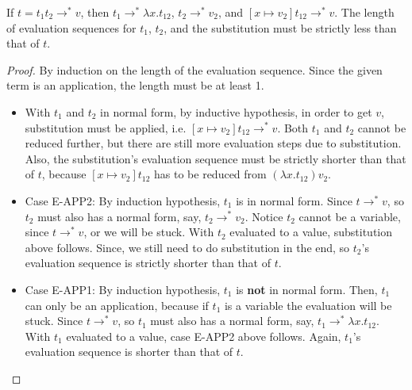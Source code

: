 \documentclass[12pt]{article}
\begin{document}
\begin{lemma}
\label{lemma:recover}
If $t = t_1t_2 \rightarrow^* v$, then $t_1 \rightarrow^* \lambda x . t_{12}$, $t_2 \rightarrow^* v_2$, and $[x \mapsto v_2] t_{12} \rightarrow^* v$.
The length of evaluation sequences for $t_1$, $t_2$, and the substitution must be strictly less than that of $t$.
\end{lemma}
\begin{proof}
By induction on the length of the evaluation sequence.
Since the given term is an application, the length must be at least 1.
\begin{itemize}
\item
With $t_1$ and $t_2$ in normal form, by inductive hypothesis, in order to get $v$, substitution must be applied, i.e. $[x \mapsto v_2] t_{12} \rightarrow^* v$.
Both $t_1$ and $t_2$ cannot be reduced further, but there are still more evaluation steps due to substitution.
Also, the substitution's evaluation sequence must be strictly shorter than that of $t$, because $[x \mapsto v_2] t_{12}$ has to be reduced from $(\lambda x . t_{12}) v_2$.
\item
Case E-APP2:
By induction hypothesis, $t_1$ is in normal form.
Since $t \rightarrow^* v$, so $t_2$ must also has a normal form, say, $t_2 \rightarrow^* v_2$.
Notice $t_2$ cannot be a variable, since $t \rightarrow^* v$, or we will be stuck.
With $t_2$ evaluated to a value, substitution above follows.
Since, we still need to do substitution in the end, so $t_2$'s evaluation sequence is strictly shorter than that of $t$.
\item
Case E-APP1:
By induction hypothesis, $t_1$ is {\bf not} in normal form.
Then, $t_1$ can only be an application, because if $t_1$ is a variable the evaluation will be stuck.
Since $t \rightarrow^* v$, so $t_1$ must also has a normal form, say, $t_1 \rightarrow^* \lambda x.t_{12}$.
With $t_1$ evaluated to a value, case E-APP2 above follows.
Again, $t_1$'s evaluation sequence is shorter than that of $t$.
\end{itemize}
\end{proof}
\end{document}
